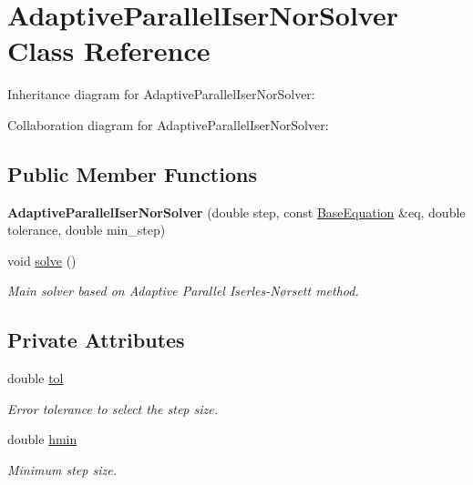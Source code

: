 \hypertarget{classAdaptiveParallelIserNorSolver}{}\section{Adaptive\+Parallel\+Iser\+Nor\+Solver Class Reference}
\label{classAdaptiveParallelIserNorSolver}


Inheritance diagram for Adaptive\+Parallel\+Iser\+Nor\+Solver\+:


Collaboration diagram for Adaptive\+Parallel\+Iser\+Nor\+Solver\+:
\subsection*{Public Member Functions}
\begin{DoxyCompactItemize}
\item 
\mbox{\label{classAdaptiveParallelIserNorSolver_ae3c79a6e2902f6c8c0550d77f08267ba}} 
{\bfseries Adaptive\+Parallel\+Iser\+Nor\+Solver} (double step, const \hyperlink{classBaseEquation}{Base\+Equation} \&eq, double tolerance, double min\+\_\+step)
\item 
\mbox{\label{classAdaptiveParallelIserNorSolver_a60b05ac78168b6e7dfc5b414d0fefdff}} 
void \hyperlink{classAdaptiveParallelIserNorSolver_a60b05ac78168b6e7dfc5b414d0fefdff}{solve} ()
\begin{DoxyCompactList}\small\item\em Main solver based on Adaptive Parallel Iserles-\/\+Nørsett method. \end{DoxyCompactList}\end{DoxyCompactItemize}
\subsection*{Private Attributes}
\begin{DoxyCompactItemize}
\item 
\mbox{\label{classAdaptiveParallelIserNorSolver_adfb74677c32e6d7d0e616566111a662d}} 
double \hyperlink{classAdaptiveParallelIserNorSolver_adfb74677c32e6d7d0e616566111a662d}{tol}
\begin{DoxyCompactList}\small\item\em Error tolerance to select the step size. \end{DoxyCompactList}\item 
\mbox{\label{classAdaptiveParallelIserNorSolver_a0c7b56485dd75ab0a923dea7bdeabca0}} 
double \hyperlink{classAdaptiveParallelIserNorSolver_a0c7b56485dd75ab0a923dea7bdeabca0}{hmin}
\begin{DoxyCompactList}\small\item\em Minimum step size. \end{DoxyCompactList}\end{DoxyCompactItemize}
